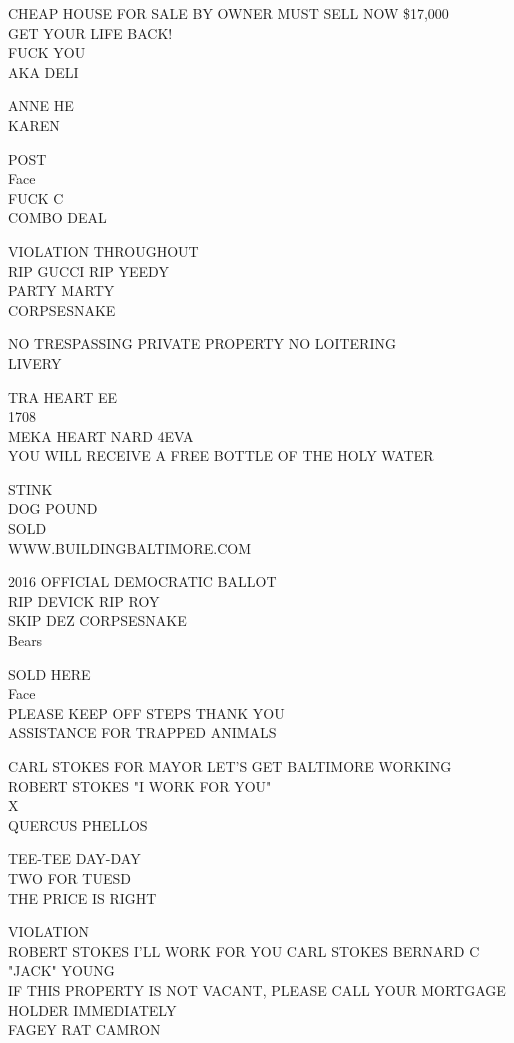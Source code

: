 \documentclass[10pt,letterpaper]{article}
\begin{document}
CHEAP HOUSE FOR SALE BY OWNER MUST SELL NOW \$17,000\\
GET YOUR LIFE BACK!\\
FUCK YOU\\
AKA DELI

ANNE HE\\
KAREN

POST\\
Face\\
FUCK C\\
COMBO DEAL

VIOLATION THROUGHOUT\\
RIP GUCCI RIP YEEDY\\
PARTY MARTY\\
CORPSESNAKE

NO TRESPASSING PRIVATE PROPERTY NO LOITERING\\
LIVERY

TRA HEART EE\\
1708\\
MEKA HEART NARD 4EVA\\
YOU WILL RECEIVE A FREE BOTTLE OF THE HOLY WATER

STINK\\
DOG POUND\\
SOLD\\
WWW.BUILDINGBALTIMORE.COM

2016 OFFICIAL DEMOCRATIC BALLOT\\
RIP DEVICK RIP ROY\\
SKIP DEZ CORPSESNAKE\\
Bears

SOLD HERE\\
Face\\
PLEASE KEEP OFF STEPS THANK YOU\\
ASSISTANCE FOR TRAPPED ANIMALS

CARL STOKES FOR MAYOR LET'S GET BALTIMORE WORKING ROBERT STOKES "I WORK FOR YOU"\\
X\\
QUERCUS PHELLOS

TEE{-}TEE DAY{-}DAY\\
TWO FOR TUESD\\
THE PRICE IS RIGHT

VIOLATION\\
ROBERT STOKES I'LL WORK FOR YOU CARL STOKES BERNARD C "JACK" YOUNG\\
IF THIS PROPERTY IS NOT VACANT, PLEASE CALL YOUR MORTGAGE HOLDER IMMEDIATELY\\
FAGEY RAT CAMRON
\end{document}
